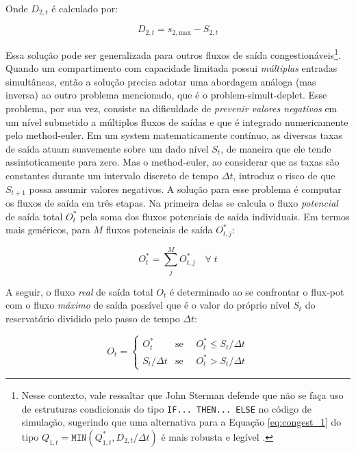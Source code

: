 \documentclass[./main.tex]{subfiles}
\begin{document}
Onde $D_{2,t}$ é calculado por:
\begin{linenomath*}
\begin{equation} 
	\label{eq:congest_2}
 D_{2,t} = s_{2, \text{max}} - S_{2,t}
\end{equation}
\end{linenomath*}
Essa solução pode ser generalizada para outros fluxos de saída congestionáveis\footnote{Nesse contexto, vale ressaltar que John Sterman defende que não se faça uso de estruturas condicionais do tipo \texttt{IF... THEN... ELSE} no código de simulação, sugerindo que uma alternativa para a Equação \eqref{eq:congest_1} do tipo $Q_{1,t} = \texttt{MIN}(Q^*_{1,t}, D_{2, t} / \Delta t)$ é mais robusta e legível \cite{sterman2000}. }. Quando um compartimento com capacidade limitada possui \textit{múltiplas} entradas simultâneas, então a solução precisa adotar uma abordagem análoga (mas inversa) ao outro problema mencionado, que é o \gls{problem-simult-deplet}. Esse problema, por sua vez, consiste na dificuldade de \textit{prevenir valores negativos} em um nível submetido a múltiplos fluxos de saídas e que é integrado numericamente pelo \gls{method-euler}. Em um \gls{system} matematicamente contínuo, as diversas taxas de saída atuam suavemente sobre um dado nível $S_t$, de maneira que ele tende assintoticamente para zero. Mas o \gls{method-euler}, ao considerar que as taxas são constantes durante um intervalo discreto de tempo $\Delta t$, introduz o risco de que $S_{t+1}$ possa assumir valores negativos. A solução para esse problema é computar os fluxos de saída em três etapas. Na primeira delas se calcula o fluxo \textit{potencial} de saída total $O^*_t$ pela soma dos fluxos potenciais de saída individuais. Em termos mais genéricos, para $M$ fluxos potenciais de saída $O^*_{t,j}$:
\begin{linenomath*}
\begin{equation} 
\label{eq:simult_1}
 O^*_t = \sum_{j}^{M}O^*_{t, j} \quad \forall\;t
\end{equation}
\end{linenomath*}
A seguir, o fluxo \textit{real} de saída total $O_t$ é determinado ao se confrontar o \gls{flux-pot} com o fluxo \textit{máximo} de saída possível que é o valor do próprio nível $S_t$ do reservatório dividido pelo passo de tempo $\Delta t$:
\begin{linenomath*}
\begin{equation} 
	\label{eq:simult_2}
 O_{t} = 
\begin{cases} 
    O^*_t & \text{se } \quad O^*_t \leq S_t / \Delta t\\
    S_t / \Delta t & \text{se } \quad O^*_t > S_t / \Delta t
\end{cases}
\end{equation}
\end{linenomath*}
\end{document}
